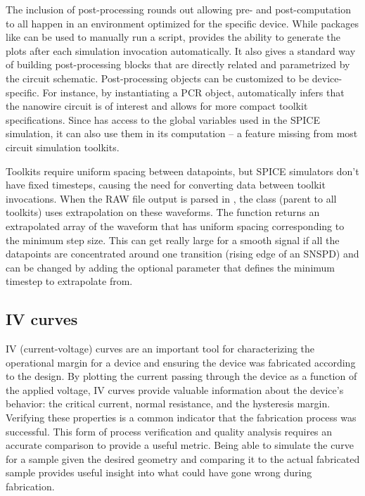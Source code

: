 The inclusion of post-processing rounds out  allowing pre- and post-computation
to all happen in an environment optimized for the specific device. While
packages like  can be used to manually 
run a script, 
provides the ability to generate the plots after each simulation invocation automatically.
It also gives a standard way of building post-processing blocks that are directly related
and parametrized by the circuit schematic. 
Post-processing objects can be customized to be device-specific.
For instance, by instantiating a PCR object,  automatically infers that 
the nanowire circuit is of interest and allows for more compact toolkit specifications.
Since  has access to the global
variables used in the SPICE simulation, it can also use them in its computation -- a feature
missing from most circuit simulation toolkits.

Toolkits require uniform spacing between datapoints, but SPICE simulators don't have fixed timesteps, 
causing the need for converting data between toolkit invocations. When the RAW file output is parsed
in , the  class (parent to all toolkits) uses extrapolation on these
waveforms. The function  returns an extrapolated  
array of the waveform that has uniform spacing corresponding to the minimum step size. This can
get really large for a smooth signal if all the datapoints are concentrated around one transition
(rising edge of an SNSPD) and can be changed by adding the optional parameter  that defines 
the minimum timestep to extrapolate from.

\subsection{IV curves}

IV (current-voltage) curves are an important tool for characterizing the operational margin for a device and ensuring the device was fabricated according to the design. By plotting the current passing through the device as a function of the applied voltage, 
IV curves provide valuable information about the device's behavior: the critical current, 
normal resistance, and the hysteresis margin. Verifying these properties is a common 
indicator that the fabrication process was successful. 
This form of process verification and quality analysis requires an accurate
comparison to provide a useful metric. Being able to simulate the curve for a sample given the desired geometry and comparing
it to the actual fabricated sample provides useful insight into what could have gone wrong during fabrication. 

